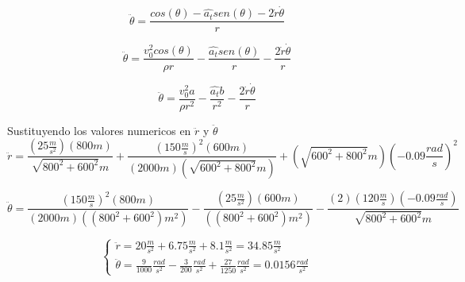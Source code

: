 \documentclass[a4paper,11pt]{scrartcl}
\begin{document}
\begin{center}
\begin{equation}
  \ddot{\theta} = \frac{cos(\theta) - \hat{a_t}sen(\theta) - 2\dot{r}\dot{\theta}}{r}
\end{equation}

\begin{equation}
  \ddot{\theta} = \frac{v_0^{2}cos(\theta)}{\rho r} - \frac{ \hat{a_t}sen(\theta)}{r} - \frac{2\dot{r}\dot{\theta}}{r}
\end{equation}

\begin{equation}
  \ddot{\theta} = \frac{v_0^{2}a}{\rho r^{2}} - \frac{\hat{a_t}b}{r^{2}} - \frac{2\dot{r}\dot{\theta}}{r}
\end{equation}

Sustituyendo los valores numericos en $\ddot{r}$ y $\ddot{\theta}$\\

\begin{equation}
  \ddot{r} = \frac{(25 \frac{m}{s^{2}})(800 m)}{\sqrt{800^{2} + 600^{2}} m} + \frac{(150 \frac{m}{s})^{2}(600 m)}{(2000 m)(\sqrt{600^{2} + 800^{2}} m)} + (\sqrt{600^{2} + 800^{2}} m)(-0.09 \frac{rad}{s})^{2}
\end{equation}

\begin{equation}
  \ddot{\theta} = \frac{(150 \frac{m}{s})^{2}(800 m)}{(2000 m)((800^{2} + 600^{2})m^{2})} - \frac{(25 \frac{m}{s^{2}})(600 m)}{((800^{2} + 600^{2})m^{2})} - \frac{(2)(120 \frac{m}{s})(-0.09 \frac{rad}{s})}{\sqrt{800^{2} + 600^{2}}m}
\end{equation}

\begin{equation}
  \left\lbrace
  \begin{array}{l}
  \ddot{r} = 20 \frac{m}{s^{2}} + 6.75 \frac{m}{s^{2}} + 8.1 \frac{m}{s^{2}} = 34.85 \frac{m}{s^{2}}\\
  \ddot{\theta} = \frac{9}{1000} \frac{rad}{s^{2}} - \frac{3}{200} \frac{rad}{s^{2}} + \frac{27}{1250} \frac{rad}{s^{2}} = 0.0156 \frac{rad}{s^{2}}
  \end{array}
  \right.
\end{equation}


\end{center}
\end{document}

